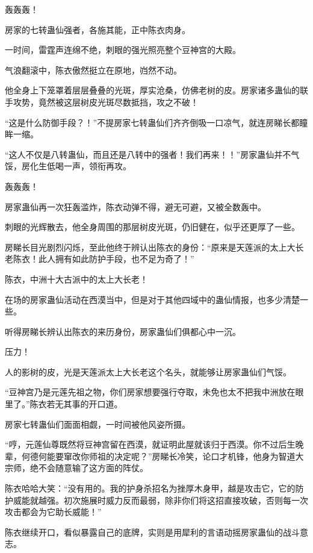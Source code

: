 
\begin{this_body}

轰轰轰！

房家的七转蛊仙强者，各施其能，正中陈衣肉身。

一时间，雷霆声连绵不绝，刺眼的强光照亮整个豆神宫的大殿。

气浪翻滚中，陈衣傲然挺立在原地，岿然不动。

他全身上下笼罩着层层叠叠的光斑，厚实沧桑，仿佛老树的皮。房家诸多蛊仙的联手攻势，竟然被这层树皮光斑尽数抵挡，攻之不破！

“这是什么防御手段？！”不提房家七转蛊仙们齐齐倒吸一口凉气，就连房睇长都瞳眸一缩。

“这人不仅是八转蛊仙，而且还是八转中的强者！我们再来！！”房家蛊仙并不气馁，房化生低喝一声，领衔再攻。

轰轰轰！

房家蛊仙再一次狂轰滥炸，陈衣动弹不得，避无可避，又被全数轰中。

刺眼的光辉散去，他全身周围的那层树皮光斑，仍旧健在，似乎还更厚了一些。

房睇长目光剧烈闪烁，至此他终于辨认出陈衣的身份：“原来是天莲派的太上大长老陈衣！此人拥有如此防护手段，也不足为奇了！”

陈衣，中洲十大古派中的太上大长老！

在场的房家蛊仙活动在西漠当中，但是对于其他四域中的蛊仙情报，也多少清楚一些。

听得房睇长辨认出陈衣的来历身份，房家蛊仙们俱都心中一沉。

压力！

人的影树的皮，光是天莲派太上大长老这个名头，就能够让房家蛊仙们气馁。

“豆神宫乃是元莲先祖之物，你们房家想要强行夺取，未免也太不把我中洲放在眼里了。”陈衣若无其事的开口道。

房家七转蛊仙们面面相觑，一时间被他风姿所摄。

“哼，元莲仙尊既然将豆神宫留在西漠，就证明此屋就该归于西漠。你不过后生晚辈，何德何能要窜改你师祖的决定呢？”房睇长冷笑，论口才机锋，他身为智道大宗师，绝不会随意输了这方面的阵仗。

陈衣哈哈大笑：“没有用的。我的护身杀招名为挫厚木身甲，越是攻击它，它的防护威能就越强。初次施展时威力反而最弱，除非你们将这招直接攻破，否则每一次攻击都会为它助长威能！”

陈衣继续开口，看似暴露自己的底牌，实则是用犀利的言语动摇房家蛊仙的战斗意志。


\end{this_body}

